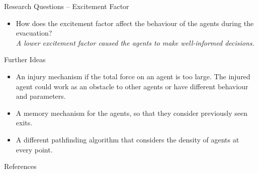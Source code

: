 \documentclass[aspectratio=43]{beamer}
\begin{document}
\begin{frame}{Research Questions -- Excitement Factor}
	\pause
	
	\begin{itemize}
		\item How does the excitement factor affect the behaviour of the agents during the evacuation? \\
		\smallskip
		\emph{A lower excitement factor caused the agents to make well-informed decisions.}
	\end{itemize}
\end{frame}


\begin{frame}{Further Ideas}
	\pause
	
	\begin{itemize}
		\item An injury mechanism if the total force on an agent is too large. The injured agent could work as an obstacle to other agents or have different behaviour and parameters. \\
		\bigskip
		\pause
		\item A memory mechanism for the agents, so that they consider previously seen exits. \\
		\bigskip
		\pause
		\item A different pathfinding algorithm that considers the density of agents at every point.
	\end{itemize}
\end{frame}


\begin{frame}{References}
	
\end{frame}


\begin{inverseframe}
\end{inverseframe}
\end{document}
